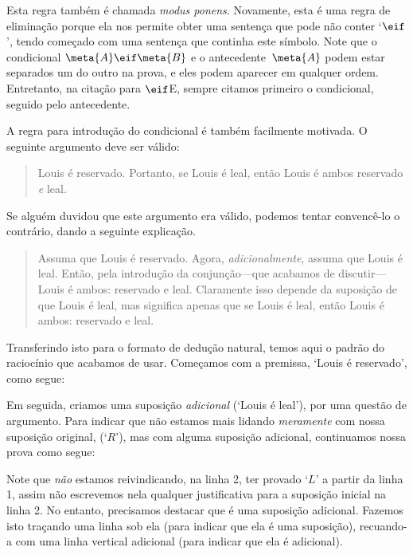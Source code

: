  Esta regra também é chamada  \emph{modus ponens}. 
Novamente, esta é uma regra de eliminação porque ela nos permite obter uma sentença que pode não conter `$\eif$', tendo começado com uma sentença que continha este símbolo. Note que o condicional  $\meta{A}\eif\meta{B}$ e o antecedente~$\meta{A}$ podem estar separados um do outro na prova, e eles podem aparecer em qualquer ordem. Entretanto, na citação para $\eif$E, sempre citamos primeiro o condicional, seguido pelo antecedente. 

 A regra para introdução do condicional é também facilmente  motivada.  O seguinte argumento deve ser válido:
	\begin{quote}
		Louis é reservado.    Portanto, se Louis é leal, então Louis é ambos  reservado \emph{e} leal.
	\end{quote}
Se alguém duvidou que este argumento era válido, podemos tentar convencê-lo o contrário, dando a seguinte explicação.
	\begin{quote}
		Assuma que  Louis é reservado.  Agora, \emph{adicionalmente}, assuma que Louis é leal.  Então, pela introdução da conjunção---que acabamos de discutir---Louis é ambos: reservado e leal.  Claramente isso depende da suposição de que Louis é leal, mas significa apenas que se Louis é leal, então Louis é ambos: reservado e leal.
	\end{quote}
Transferindo isto para o formato de dedução natural,  temos aqui o padrão do raciocínio  que acabamos de usar.  Começamos com a premissa, `Louis é reservado',  como segue: 

 
	\begin{fitchproof}
	\end{fitchproof}
Em seguida, criamos uma suposição \emph{adicional} (`Louis é leal'),  por uma questão de argumento. Para indicar que não estamos mais lidando  \emph{meramente} com nossa suposição original, (`$R$'),  mas com alguma suposição adicional,  continuamos  nossa prova como segue:
	\begin{fitchproof}
		\hypo{r}{R}
		\open
			\hypo{l}{L}
	\end{fitchproof}
Note que \emph{não}  estamos reivindicando, na linha 2, ter provado  `$L$' a partir da linha 1, assim não escrevemos nela qualquer justificativa para a suposição inicial na linha 2. No entanto, precisamos destacar que é uma suposição adicional. Fazemos isto traçando uma linha sob ela (para indicar que ela é uma suposição), recuando-a com uma linha vertical adicional (para indicar que ela é adicional).

